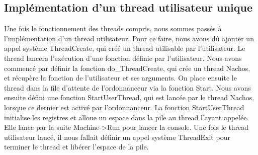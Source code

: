 \documentclass[11pt]{article}
\begin{document}
\subsection{Implémentation d'un thread utilisateur unique}
Une fois le fonctionnement des threads compris, nous sommes passés à l'implémentation d'un thread utilisateur.
Pour ce faire, nous avons dû ajouter un appel système \textcolor{blue2}{ThreadCreate}, qui créé un thread utilisable par l'utilisateur. Le thread lancera l'exécution d'une fonction définie par l'utilisateur.
\newline
Nous avons commencé par définir la fonction \textcolor{red2}{do\_ThreadCreate}, qui crée un thread Nachos, et récupère la fonction de l'utilisateur et ses arguments. On place ensuite le thread dans la file d'attente de l'ordonnanceur via la fonction \textcolor{red2}{Start}.
Nous avons ensuite défini une fonction \textcolor{red2}{StartUserThread}, qui est lancée par le thread Nachos, lorsque ce dernier est activé par l'ordonnanceur.
La fonction \textcolor{red2}{StartUserThread} initialise les registres et alloue un espace dans la pile au thread l'ayant appelée. Elle lance par la suite \textcolor{red2}{Machine->Run} pour lancer la console.
Une fois le thread utilisateur lancé, il nous fallait définir un appel système \textcolor{blue2}{ThreadExit} pour terminer le thread et libérer l'espace de la pile.
\end{document}
